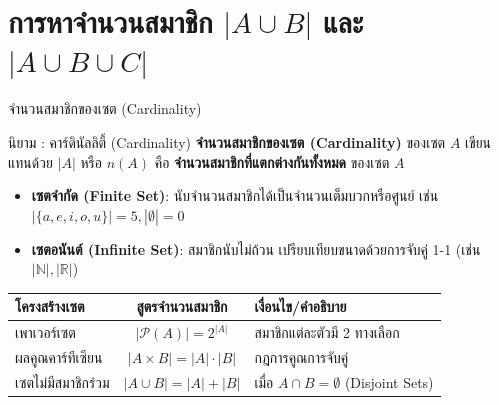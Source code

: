 \section{\texorpdfstring{การหาจำนวนสมาชิก $|A \cup B|$ และ $|A \cup B \cup C|$}{การหาจำนวนสมาชิก AUB และ AUBUC}}

\begin{frame}{จำนวนสมาชิกของเซต (Cardinality)}
  \begin{block}{นิยาม : คาร์ดินัลลิตี้ (Cardinality)}
    \textbf{จำนวนสมาชิกของเซต (Cardinality)} ของเซต $A$ เขียนแทนด้วย $|A|$ หรือ $n(A)$
    คือ \textbf{จำนวนสมาชิกที่แตกต่างกันทั้งหมด} ของเซต $A$
  \end{block}
  \vspace{0.2em}
  \begin{itemize}
    \item \textbf{เซตจำกัด (Finite Set)}: นับจำนวนสมาชิกได้เป็นจำนวนเต็มบวกหรือศูนย์ เช่น $|\{a,e,i,o,u\}| = 5, |\emptyset| = 0$
    \item \textbf{เซตอนันต์ (Infinite Set)}: สมาชิกนับไม่ถ้วน เปรียบเทียบขนาดด้วยการจับคู่ 1-1 (เช่น $|\mathbb{N}|, |\mathbb{R}|$)
  \end{itemize}
  \vspace{0.2em}
  \begin{center}\small
  \begin{tabular}{|l|c|l|}
    \hline
    \textbf{โครงสร้างเซต} & \textbf{สูตรจำนวนสมาชิก} & \textbf{เงื่อนไข/คำอธิบาย} \\ \hline
    เพาเวอร์เซต & $|\mathcal{P}(A)| = 2^{|A|}$ & สมาชิกแต่ละตัวมี 2 ทางเลือก \\ \hline
    ผลคูณคาร์ทีเซียน & $|A \times B| = |A| \cdot |B|$ & กฎการคูณการจับคู่ \\ \hline
    เซตไม่มีสมาชิกร่วม & $|A \cup B| = |A| + |B|$ & เมื่อ $A \cap B = \emptyset$ (Disjoint Sets) \\ \hline
  \end{tabular}
  \end{center}
\end{frame}

